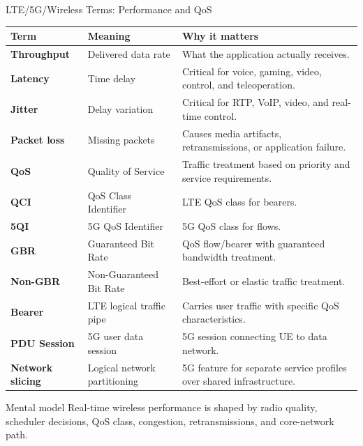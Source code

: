 \documentclass[aspectratio=169]{beamer}
\begin{document}
\begin{frame}{LTE/5G/Wireless Terms: Performance and QoS}
\tiny
\begin{tabular}{p{2.0cm} p{3.4cm} p{6.7cm}}
\toprule
\textbf{Term} & \textbf{Meaning} & \textbf{Why it matters} \\
\midrule
\textbf{Throughput} & Delivered data rate & What the application actually receives. \\
\textbf{Latency} & Time delay & Critical for voice, gaming, video, control, and teleoperation. \\
\textbf{Jitter} & Delay variation & Critical for RTP, VoIP, video, and real-time control. \\
\textbf{Packet loss} & Missing packets & Causes media artifacts, retransmissions, or application failure. \\
\textbf{QoS} & Quality of Service & Traffic treatment based on priority and service requirements. \\
\textbf{QCI} & QoS Class Identifier & LTE QoS class for bearers. \\
\textbf{5QI} & 5G QoS Identifier & 5G QoS class for flows. \\
\textbf{GBR} & Guaranteed Bit Rate & QoS flow/bearer with guaranteed bandwidth treatment. \\
\textbf{Non-GBR} & Non-Guaranteed Bit Rate & Best-effort or elastic traffic treatment. \\
\textbf{Bearer} & LTE logical traffic pipe & Carries user traffic with specific QoS characteristics. \\
\textbf{PDU Session} & 5G user data session & 5G session connecting UE to data network. \\
\textbf{Network slicing} & Logical network partitioning & 5G feature for separate service profiles over shared infrastructure. \\
\bottomrule
\end{tabular}

\vspace{0.15cm}
\begin{block}{Mental model}
Real-time wireless performance is shaped by radio quality, scheduler decisions, QoS class, congestion, retransmissions, and core-network path.
\end{block}
\end{frame}
\end{document}
